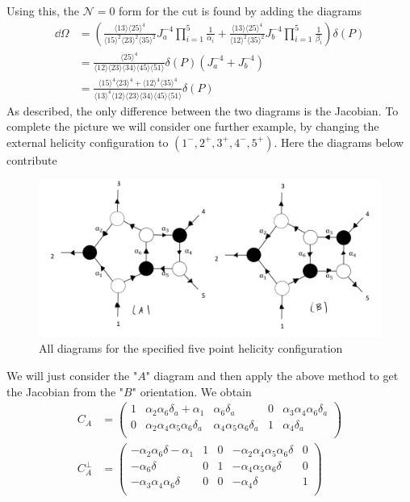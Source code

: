 \documentclass[letter,11pt]{article}
\newcommand{\ab}[1]{\langle #1 \rangle}
\begin{document}
Using this, the $\mathcal{N}=0$ form for the cut is found by adding the diagrams
\begin{equation}
	\begin{aligned}
		\dd\Omega
		&=\left(\frac{\ab{13}\ab{25}^4}{\ab{15}^2\ab{23}^2\ab{35}^2}J_a^{-4}\prod_{i=1}^{5}\frac{1}{\alpha_i}+\frac{\ab{13}\ab{25}^4}{\ab{12}^2\ab{35}^2}J_b^{-4}\prod_{i=1}^{5}\frac{1}{\beta_i}\right)\delta(P)\\
		&=\frac{\ab{25}^4}{\ab{12}\ab{23}\ab{34}\ab{45}\ab{51}}\delta(P)\left(J_a^{-4}+J_b^{-4}\right)\\
		&=\frac{\ab{15}^4\ab{23}^4+\ab{12}^4\ab{35}^4}{\ab{13}^4\ab{12}\ab{23}\ab{34}\ab{45}\ab{51}}\delta(P)
	\end{aligned}
\end{equation}
As described, the only difference between the two diagrams is the Jacobian. To complete the picture we will consider one further example, by changing the external helicity configuration to $(1^-,2^+,3^+,4^-,5^+)$. Here the diagrams below contribute
\begin{figure}[H]
	\centering
	\includegraphics[width=0.7\linewidth]{5pt4}
	\caption{All diagrams for the specified five point helicity configuration}
	\label{fig:5pt}
\end{figure}
We will just consider the "$A$" diagram and then apply the above method to get the Jacobian from the "$B$" orientation.
We obtain
\begin{equation}
	\begin{aligned}
		C_A&=\left(
		\begin{array}{ccccc}
			1 & \alpha _2 \alpha _6 \delta_a +\alpha _1 & \alpha _6 \delta_a  & 0 & \alpha _3 \alpha _4 \alpha _6 \delta_a  \\
			0 & \alpha _2 \alpha _4 \alpha _5 \alpha _6 \delta_a  & \alpha _4 \alpha _5 \alpha _6 \delta_a  & 1 & \alpha _4 \delta_a  \\
		\end{array}
		\right)\\
		C_A^\perp &=\left(
		\begin{array}{ccccc}
			-\alpha _2 \alpha _6 \delta -\alpha _1 & 1 & 0 & -\alpha _2 \alpha _4 \alpha _5 \alpha _6\delta & 0 \\
			-\alpha _6 \delta  & 0 & 1 & -\alpha _4 \alpha _5 \alpha _6 \delta & 0 \\
			-\alpha _3 \alpha _4 \alpha _6 \delta  & 0 & 0 & -\alpha _4 \delta & 1 \\
		\end{array}
		\right)
	\end{aligned}
\end{equation}
\end{document}
